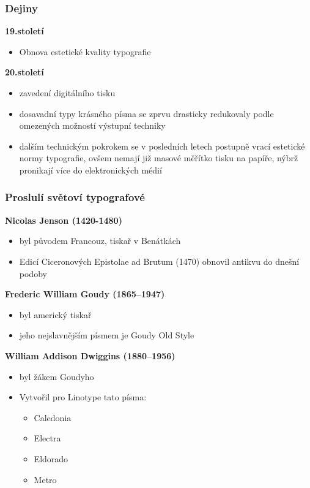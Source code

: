 \documentclass{beamer}
\begin{document}
\begin{frame}
\frametitle{Dejiny}
\textbf{19.století}
\begin{itemize}
\item{Obnova estetické kvality typografie}
\end{itemize}
\textbf{20.století}
\begin{itemize}
\item{zavedení digitálního tisku}
\item{dosavadní typy krásného písma se zprvu drasticky redukovaly podle omezených možností výstupní techniky}
\item{dalším technickým pokrokem se v posledních letech postupně vrací estetické normy typografie, ovšem nemají již masové měřítko tisku na papíře, nýbrž pronikají více do elektronických médií}
\end{itemize}
\end{frame}
\begin{frame}
\frametitle{Proslulí světoví typografové}
\textbf{Nicolas Jenson (1420-1480)}
\begin{itemize}
\item{byl původem Francouz, tiskař v Benátkách}
\item{ Edicí Ciceronových Epistolae ad Brutum (1470) obnovil antikvu do dnešní podoby}
\end{itemize}
\textbf{Frederic William Goudy (1865–1947)}
\begin{itemize}
\item{byl americký tiskař}
\item{jeho nejslavnějším písmem je Goudy Old Style}
\end{itemize}
\textbf{William Addison Dwiggins (1880–1956)}
\begin{itemize}
\item{byl žákem Goudyho} 
\item {Vytvořil pro Linotype tato písma:} 
\begin{itemize}
\item{Caledonia}
\item{Electra}
\item{Eldorado}
\item{Metro}
\end{itemize}
\end{itemize}
\end{frame}
\end{document}
